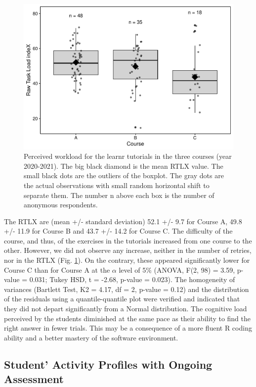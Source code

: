 \documentclass{aims} %
\theoremstyle{definition}
\begin{document}
\begin{figure}
\includegraphics[width=1\linewidth]{teaching_data_science_files/figure-latex/fig_rtlx-1} \caption{\label{fig:fig_rtlx} Perceived workload for the learnr tutorials in the three courses (year 2020-2021). The big black diamond is the mean RTLX value. The small black dots are the outliers of the boxplot. The gray dots are the actual observations with small random horizontal shift to separate them. The number n above each box is the number of anonymous respondents.}\label{fig:fig_rtlx}
\end{figure}

The RTLX are (mean +/- standard deviation) 52.1 +/- 9.7 for Course A,
49.8 +/- 11.9 for Course B and 43.7 +/- 14.2 for Course C. The
difficulty of the course, and thus, of the exercises in the tutorials
increased from one course to the other. However, we did not observe any
increase, neither in the number of retries, nor in the RTLX (Fig.
\ref {fig:fig_rtlx}). On the contrary, these appeared significantly
lower for Course C than for Course A at the \(\alpha\) level of 5\%
(ANOVA, F(2, 98) = 3.59, p-value = 0.031; Tukey HSD, t = -2.68, p-value
= 0.023). The homogeneity of variances (Bartlett Test, K2 = 4.17, df =
2, p-value = 0.12) and the distribution of the residuals using a
quantile-quantile plot were verified and indicated that they did not
depart significantly from a Normal distribution. The cognitive load
perceived by the students diminished at the same pace as their ability
to find the right answer in fewer trials. This may be a consequence of a
more fluent R coding ability and a better mastery of the software
environment.

\hypertarget{student-activity-profiles-with-ongoing-assessment}{%
\subsection{Student' Activity Profiles with Ongoing
Assessment}\label{student-activity-profiles-with-ongoing-assessment}}
\end{document}
